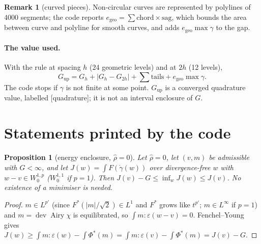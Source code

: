 \documentclass[11pt]{article}
\newtheorem{proposition}[theorem]{Proposition}
\theoremstyle{definition}
\newtheorem{remark}[theorem]{Remark}
\newcommand{\eps}{\varepsilon}
\newcommand{\gd}{\dot\gamma}
\newcommand{\dev}{\operatorname{dev}}
\newcommand{\Airy}{\operatorname{Airy}}
\begin{document}
\begin{remark}[curved pieces]
Non-circular curves are represented by polylines of 4000 segments; the code reports
$e_{\mathrm{geo}}=\sum\text{chord}\times\text{sag}$, which bounds the area between curve and polyline for smooth curves, and adds
$e_{\mathrm{geo}}\max\gamma$ to the gap.
\end{remark}

\paragraph{The value used.} With the rule at spacing $h$ (24 geometric levels) and at $2h$ (12 levels),
\[
G_{\mathrm{up}}=G_h+|G_h-G_{2h}|+\sum\text{tails}+e_{\mathrm{geo}}\max\gamma .
\]
The code stops if $\gamma$ is not finite at some point. $G_{\mathrm{up}}$ is a converged quadrature value, labelled
[quadrature]; it is not an interval enclosure of $G$.

\section{Statements printed by the code}

\begin{proposition}[energy enclosure, $\hat\rho=0$]\label{prop:enc}
Let $\hat\rho=0$, let $(v,m)$ be admissible with $G<\infty$, and let $J(w)=\int F(\gd(w))$ over divergence-free $w$
with $w-v\in W^{1,p}_0$ ($W^{1,1}_0$ if $p=1$). Then $J(v)-G\le\inf_wJ(w)\le J(v)$. No existence of a minimiser is
needed.
\end{proposition}
\begin{proof}
$m\in L^{p'}$ (since $F^*(|m|/\sqrt2)\in L^1$ and $F^*$ grows like $t^{p'}$; $m\in L^\infty$ if $p=1$) and $m=\dev\Airy\chi$ is
equilibrated, so $\int m:\eps(w-v)=0$. Fenchel--Young gives $J(w)\ge\int m:\eps(w)-\int\Phi^*(m)=\int m:\eps(v)-\int\Phi^*(m)=J(v)-G$.
\end{proof}
\end{document}
